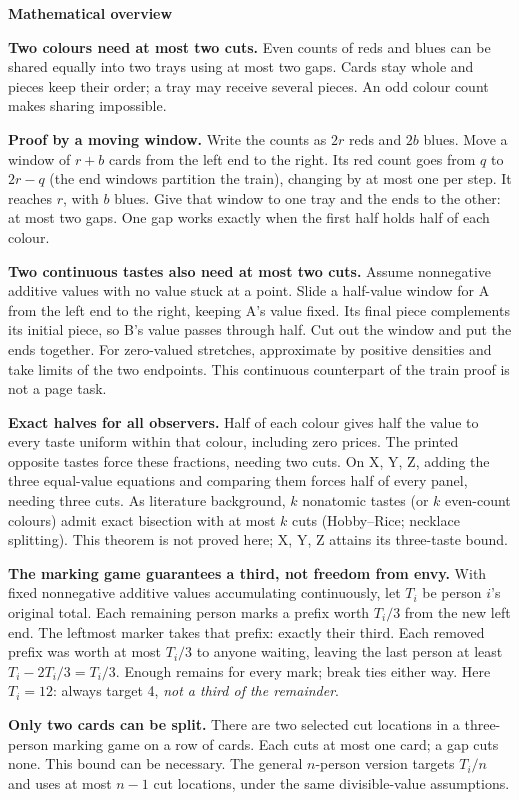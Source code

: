 \documentclass[11pt]{article}
\newcommand{\head}[1]{\par\textbf{\large #1}\par}
\begin{document}
\head{Mathematical overview}
\textbf{Two colours need at most two cuts.} Even counts of reds and blues can be shared equally into two trays using at most two gaps. Cards stay whole and pieces keep their order; a tray may receive several pieces. An odd colour count makes sharing impossible.

\textbf{Proof by a moving window.} Write the counts as $2r$ reds and $2b$ blues. Move a window of $r+b$ cards from the left end to the right. Its red count goes from $q$ to $2r-q$ (the end windows partition the train), changing by at most one per step. It reaches $r$, with $b$ blues. Give that window to one tray and the ends to the other: at most two gaps. One gap works exactly when the first half holds half of each colour.

\textbf{Two continuous tastes also need at most two cuts.} Assume nonnegative additive values with no value stuck at a point. Slide a half-value window for A from the left end to the right, keeping A's value fixed. Its final piece complements its initial piece, so B's value passes through half. Cut out the window and put the ends together. For zero-valued stretches, approximate by positive densities and take limits of the two endpoints. This continuous counterpart of the train proof is not a page task.

\textbf{Exact halves for all observers.} Half of each colour gives half the value to every taste uniform within that colour, including zero prices. The printed opposite tastes force these fractions, needing two cuts. On X, Y, Z, adding the three equal-value equations and comparing them forces half of every panel, needing three cuts. As literature background, $k$ nonatomic tastes (or $k$ even-count colours) admit exact bisection with at most $k$ cuts (Hobby--Rice; necklace splitting). This theorem is not proved here; X, Y, Z attains its three-taste bound.

\textbf{The marking game guarantees a third, not freedom from envy.} With fixed nonnegative additive values accumulating continuously, let $T_i$ be person $i$'s original total. Each remaining person marks a prefix worth $T_i/3$ from the new left end. The leftmost marker takes that prefix: exactly their third. Each removed prefix was worth at most $T_i/3$ to anyone waiting, leaving the last person at least $T_i-2T_i/3=T_i/3$. Enough remains for every mark; break ties either way. Here $T_i=12$: always target 4, \emph{not a third of the remainder}.

\textbf{Only two cards can be split.} There are two selected cut locations in a three-person marking game on a row of cards. Each cuts at most one card; a gap cuts none. This bound can be necessary. The general $n$-person version targets $T_i/n$ and uses at most $n-1$ cut locations, under the same divisible-value assumptions.
\end{document}
